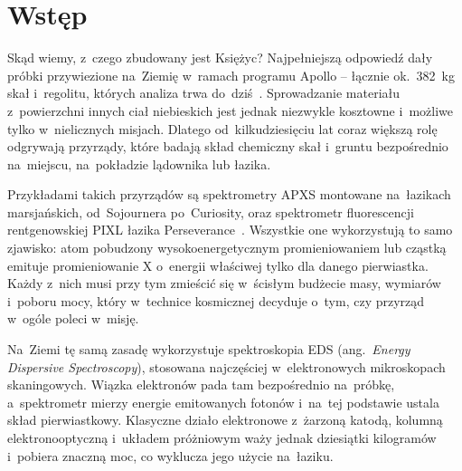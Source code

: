 
\chapter{Wstęp}

Skąd wiemy, z~czego zbudowany jest Księżyc? Najpełniejszą odpowiedź dały
próbki przywiezione na~Ziemię w~ramach programu Apollo -- łącznie
ok.~382~kg skał i~regolitu, których analiza trwa do~dziś~\cite{TODO-apollo}.
Sprowadzanie materiału z~powierzchni innych ciał niebieskich jest jednak
niezwykle kosztowne i~możliwe tylko w~nielicznych misjach. Dlatego
od~kilkudziesięciu lat coraz większą rolę odgrywają przyrządy, które
badają skład chemiczny skał i~gruntu bezpośrednio na~miejscu,
na~pokładzie lądownika lub łazika.

Przykładami takich przyrządów są spektrometry APXS montowane na~łazikach
marsjańskich, od~Sojournera po~Curiosity, oraz spektrometr fluorescencji
rentgenowskiej PIXL łazika Perseverance~\cite{TODO-apxs,TODO-pixl}.
Wszystkie one wykorzystują to samo zjawisko: atom pobudzony
wysokoenergetycznym promieniowaniem lub cząstką emituje promieniowanie X
o~energii właściwej tylko dla danego pierwiastka. Każdy z~nich musi
przy tym zmieścić się w~ścisłym budżecie masy, wymiarów i~poboru mocy,
który w~technice kosmicznej decyduje o~tym, czy przyrząd w~ogóle
poleci w~misję.

Na~Ziemi tę samą zasadę wykorzystuje spektroskopia EDS
(ang.~\textit{Energy Dispersive Spectroscopy}), stosowana najczęściej
w~elektronowych mikroskopach skaningowych. Wiązka elektronów pada tam
bezpośrednio na~próbkę, a~spektrometr mierzy energie emitowanych fotonów
i~na~tej podstawie ustala skład pierwiastkowy. Klasyczne działo
elektronowe z~żarzoną katodą, kolumną elektronooptyczną i~układem
próżniowym waży jednak dziesiątki kilogramów i~pobiera znaczną moc,
co wyklucza jego użycie na~łaziku.

